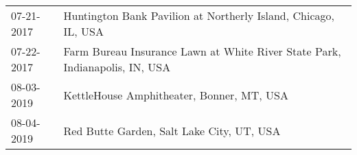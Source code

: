 \begin{supertabular}{ll}
 07-21-2017 &               Huntington Bank Pavilion at Northerly Island, Chicago, IL, USA \\
 07-22-2017 &  Farm Bureau Insurance Lawn at White River State Park, Indianapolis, IN, USA \\
 08-03-2019 &                                    KettleHouse Amphitheater, Bonner, MT, USA \\
 08-04-2019 &                                    Red Butte Garden, Salt Lake City, UT, USA \\
\end{supertabular}
